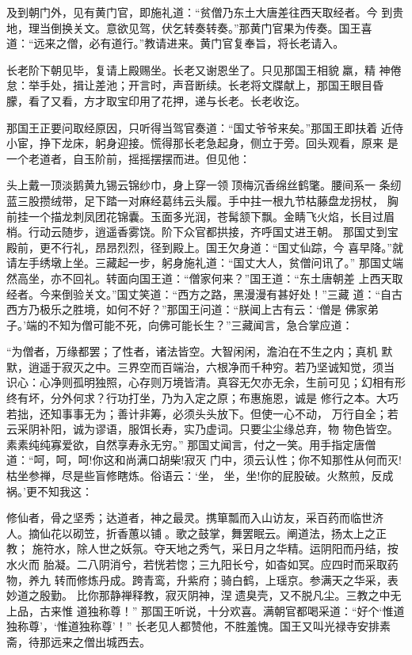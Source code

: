 及到朝门外，见有黄门官，即施礼道：“贫僧乃东土大唐差往西天取经者。今
到贵地，理当倒换关文。意欲见驾，伏乞转奏转奏。”那黄门官果为传奏。国王喜
道：“远来之僧，必有道行。”教请进来。黄门官复奉旨，将长老请入。

长老阶下朝见毕，复请上殿赐坐。长老又谢恩坐了。只见那国王相貌羸，精
神倦怠：举手处，揖让差池；开言时，声音断续。长老将文牒献上，那国王眼目昏
朦，看了又看，方才取宝印用了花押，递与长老。长老收讫。

那国王正要问取经原因，只听得当驾官奏道：“国丈爷爷来矣。”那国王即扶着
近侍小宦，挣下龙床，躬身迎接。慌得那长老急起身，侧立于旁。回头观看，原来
是一个老道者，自玉阶前，摇摇摆摆而进。但见他：

头上戴一顶淡鹅黄九锡云锦纱巾，身上穿一领顶梅沉香绵丝鹤氅。腰间系一
条纫蓝三股攒绒带，足下踏一对麻经葛纬云头履。手中拄一根九节枯藤盘龙拐杖，
胸前挂一个描龙刺凤团花锦囊。玉面多光润，苍髯颔下飘。金睛飞火焰，长目过眉
梢。行动云随步，逍遥香雾饶。阶下众官都拱接，齐呼国丈进王朝。
那国丈到宝殿前，更不行礼，昂昂烈烈，径到殿上。国王欠身道：“国丈仙踪，今
喜早降。”就请左手绣墩上坐。三藏起一步，躬身施礼道：“国丈大人，贫僧问讯了。”
那国丈端然高坐，亦不回礼。转面向国王道：“僧家何来？”国王道：“东土唐朝差
上西天取经者。今来倒验关文。”国丈笑道：“西方之路，黑漫漫有甚好处！”三藏
道：“自古西方乃极乐之胜境，如何不好？”那国王问道：“朕闻上古有云：‘僧是
佛家弟子。’端的不知为僧可能不死，向佛可能长生？”三藏闻言，急合掌应道：

“为僧者，万缘都罢；了性者，诸法皆空。大智闲闲，澹泊在不生之内；真机
默默，逍遥于寂灭之中。三界空而百端治，六根净而千种穷。若乃坚诚知觉，须当
识心：心净则孤明独照，心存则万境皆清。真容无欠亦无余，生前可见；幻相有形
终有坏，分外何求？行功打坐，乃为入定之原；布惠施恩，诚是
修行之本。大巧若拙，还知事事无为；善计非筹，必须头头放下。但使一心不动，
万行自全；若云采阴补阳，诚为谬语，服饵长寿，实乃虚词。只要尘尘缘总弃，物
物色皆空。素素纯纯寡爱欲，自然享寿永无穷。”
那国丈闻言，付之一笑。用手指定唐僧道：“呵，呵，呵!你这和尚满口胡柴!寂灭
门中，须云认性；你不知那性从何而灭!枯坐参禅，尽是些盲修瞎炼。俗语云：‘坐，
坐，坐!你的屁股破。火熬煎，反成祸。’更不知我这：

修仙者，骨之坚秀；达道者，神之最灵。携箪瓢而入山访友，采百药而临世济
人。摘仙花以砌笠，折香蕙以铺。歌之鼓掌，舞罢眠云。阐道法，扬太上之正教；
施符水，除人世之妖氛。夺天地之秀气，采日月之华精。运阴阳而丹结，按水火而
胎凝。二八阴消兮，若恍若惚；三九阳长兮，如杳如冥。应四时而采取药物，养九
转而修炼丹成。跨青鸾，升紫府；骑白鹤，上瑶京。参满天之华采，表妙道之殷勤。
比你那静禅释教，寂灭阴神，涅遗臭壳，又不脱凡尘。三教之中无上品，古来惟
道独称尊！”
那国王听说，十分欢喜。满朝官都喝采道：“好个‘惟道独称尊’，‘惟道独称尊’！”
长老见人都赞他，不胜羞愧。国王又叫光禄寺安排素斋，待那远来之僧出城西去。


